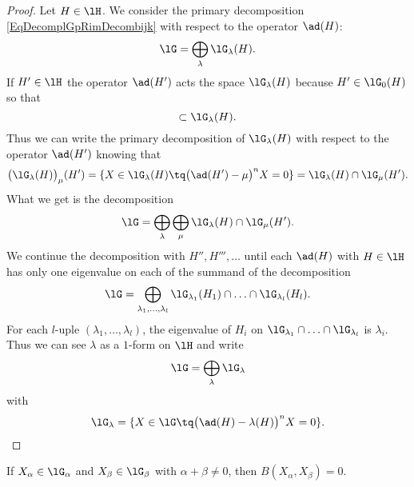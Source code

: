 \begin{proof}
    Let \( H\in\lH\). We consider the primary decomposition \eqref{EqDecomplGpRimDecombijk} with respect to the operator \( \ad(H)\):
    \begin{equation}
        \lG=\bigoplus_{\lambda}\lG_{\lambda}(H).
    \end{equation}
    If \( H'\in\lH\) the operator \( \ad(H')\) acts the space \( \lG_{\lambda}(H)\) because \( H'\in\lG_0(H)\) so that
    \begin{equation}
        [H',\lG_{\lambda}(H)]\subset\lG_{\lambda}(H).
    \end{equation}
    Thus we can write the primary decomposition of \( \lG_{\lambda}(H)\) with respect to the operator \( \ad(H')\) knowing that
    \begin{equation}
        \big( \lG_{\lambda}(H) \big)_{\mu}(H')=\{ X\in\lG_{\lambda}(H)\tq\big( \ad(H')-\mu \big)^nX=0 \}=\lG_{\lambda}(H)\cap\lG_{\mu}(H').
    \end{equation}
    What we get is the decomposition
    \begin{equation}
        \lG=\bigoplus_{\lambda}\bigoplus_{\mu}\lG_{\lambda}(H)\cap\lG_{\mu}(H').
    \end{equation}
    We continue the decomposition with \( H'',H''',\ldots\) until each \( \ad(H)\) with \( H\in\lH\) has only one eigenvalue on each of the summand of the decomposition
    \begin{equation}
        \lG=\bigoplus_{\lambda_1,\ldots,\lambda_l}\lG_{\lambda_1}(H_1)\cap\ldots\cap\lG_{\lambda_l}(H_l).
    \end{equation}
    For each \( l\)-uple \( (\lambda_1,\ldots,\lambda_l)\), the eigenvalue of \( H_i\) on \( \lG_{\lambda_1}\cap\ldots\cap\lG_{\lambda_l}\) is \( \lambda_i\). Thus we can see \( \lambda\) as a \( 1\)-form on \( \lH\) and write
    \begin{equation}        \label{EqdirectumlGRoots}
        \lG=\bigoplus_{\lambda}\lG_{\lambda}
    \end{equation}
    with
    \begin{equation}
        \lG_{\lambda}=\{ X\in\lG\tq\big( \ad(H)-\lambda(H) \big)^nX=0 \}.
    \end{equation}
\end{proof}

\begin{corollary}\label{cor:Bxy_zero}
    If $X_{\alpha}\in\lG_{\alpha}$ and $X_{\beta}\in\lG_{\beta}$ with $\alpha+\beta\neq 0$, then $B(X_{\alpha},X_{\beta})=0$.
\end{corollary}

